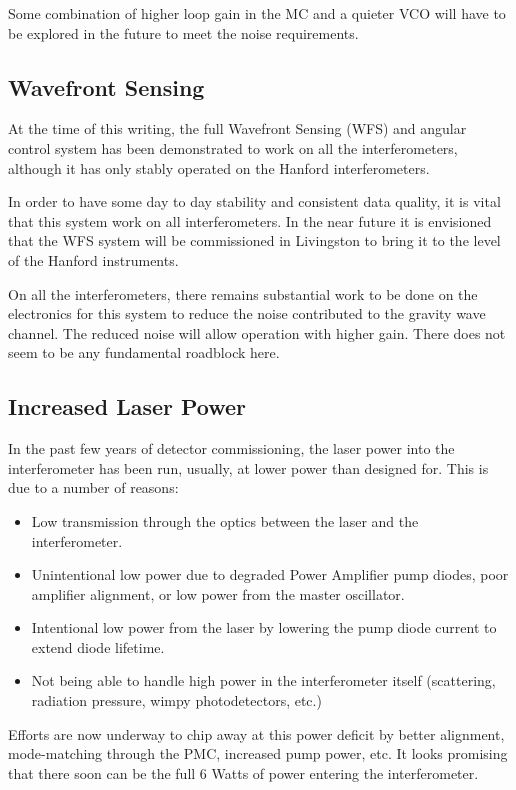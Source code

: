 Some combination of higher loop gain in the MC and a quieter VCO will have to
be explored in the future to meet the noise requirements.


\subsection{Wavefront Sensing}
\label{sec:WFSfuture}

At the time of this writing, the full Wavefront Sensing (WFS) and angular control
system has been demonstrated to work on all the interferometers, although it
has only stably operated on the Hanford interferometers.

In order to have some day to day stability and consistent data quality, it is
vital that this system work on all interferometers. In the near future it is
envisioned that the WFS system will be commissioned in Livingston to bring it
to the level of the Hanford instruments.

On all the interferometers, there remains substantial work to be done on the
electronics for this system to reduce the noise contributed to the gravity
wave channel. The reduced noise will allow operation with higher gain. 
There does not seem to be any fundamental roadblock here.


\subsection{Increased Laser Power}

In the past few years of detector commissioning, the laser power into the
interferometer has been run, usually, at lower power than designed for. 
This is due to a number of reasons:

\begin{itemize}
\item Low transmission through the optics between the laser and the interferometer.
\item Unintentional low power due to degraded Power Amplifier pump diodes, poor amplifier
      alignment, or low power from the master oscillator.
\item Intentional low power from the laser by lowering the pump diode current to extend
      diode lifetime.
\item Not being able to handle high power in the interferometer itself (scattering,
      radiation pressure, wimpy photodetectors, etc.)
\end{itemize}

Efforts are now underway to chip away at this power deficit by better alignment,
mode-matching through the PMC, increased pump power, etc. It looks promising that
there soon can be the full 6 Watts of power entering the interferometer.

